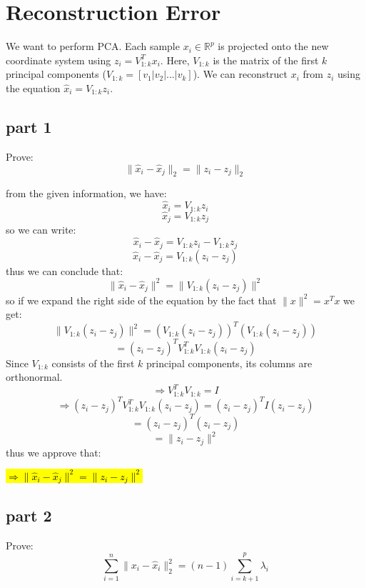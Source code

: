 \section{Reconstruction Error}
We want to perform PCA. Each sample $x_i \in \mathbb{R}^p$ is projected onto the new coordinate system using $z_i = V_{1:k}^T x_i$. Here, $V_{1:k}$ is the matrix of the first $k$ principal components ($V_{1:k} = [v_1|v_2|...|v_k]$). We can reconstruct $x_i$ from $z_i$ using the equation $\hat{x}_i = V_{1:k} z_i$.

\subsection{part 1}

Prove:
\[
\| \hat{x}_i - \hat{x}_j \|_2 = \| z_i - z_j \|_2
\]
\begin{qsolve}
    \begin{qsolve}[]
        from the given information, we have:
        \[
        \hat{x}_i = V_{1:k} z_i
        \]
        \[
        \hat{x}_j = V_{1:k} z_j
        \]
        so we can write:
        \[
        \hat{x}_i - \hat{x}_j = V_{1:k} z_i - V_{1:k} z_j
        \]
        \[
        \hat{x}_i - \hat{x}_j = V_{1:k} (z_i - z_j)
        \]
        thus we can conclude that:
        \[
        \| \hat{x}_i - \hat{x}_j \|^2 = \| V_{1:k} (z_i - z_j) \|^2
        \]
        so if we expand the right side of the equation by the fact that $\| x \|^2 = x^T x$ we get:
        \[
        \| V_{1:k} (z_i - z_j) \|^2 = (V_{1:k} (z_i - z_j))^T (V_{1:k} (z_i - z_j))
        \]
        \[
        = (z_i - z_j)^T V_{1:k}^T V_{1:k} (z_i - z_j)
        \]
        Since $V_{1:k}$ consists of the first $k$ principal components, its columns are orthonormal.
        \[
        \Rightarrow V_{1:k}^T V_{1:k} = I
        \]
        \[
        \Rightarrow (z_i - z_j)^T V_{1:k}^T V_{1:k} (z_i - z_j) = (z_i - z_j)^T I (z_i - z_j)
        \]
        \[
        = (z_i - z_j)^T (z_i - z_j)
        \]
        \[
        = \| z_i - z_j \|^2
        \]
        thus we approve that:
        \begin{center}
            \hl{$\Rightarrow \| \hat{x}_i - \hat{x}_j \|^2 = \| z_i - z_j \|^2$}
        \end{center}
        
    \end{qsolve}
\end{qsolve}
\subsection{part 2}
Prove:
\[
\sum_{i=1}^n \| x_i - \hat{x}_i \|_2^2 = (n - 1) \sum_{i=k+1}^p \lambda_i
\]

